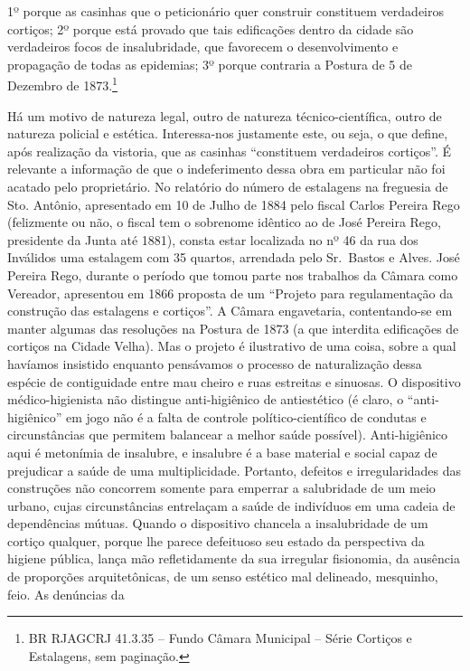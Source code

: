 1º porque as casinhas que o peticionário quer construir constituem
verdadeiros cortiços; 2º porque está provado que tais edificações dentro
da cidade são verdadeiros focos de insalubridade, que favorecem o
desenvolvimento e propagação de todas as epidemias; 3º porque contraria
a Postura de 5 de Dezembro de 1873.\footnote{BR RJAGCRJ 41.3.35 -- Fundo
  Câmara Municipal -- Série Cortiços e Estalagens, sem paginação.}

Há um motivo de natureza legal, outro de natureza técnico-científica,
outro de natureza policial e estética. Interessa-nos justamente este, ou
seja, o que define, após realização da vistoria, que as casinhas
``constituem verdadeiros cortiços''. É relevante a informação de que o
indeferimento dessa obra em particular não foi acatado pelo
proprietário. No relatório do número de estalagens na freguesia de Sto.
Antônio, apresentado em 10 de Julho de 1884 pelo fiscal Carlos Pereira
Rego (felizmente ou não, o fiscal tem o sobrenome idêntico ao de José
Pereira Rego, presidente da Junta até 1881), consta estar localizada no
nº 46 da rua dos Inválidos uma estalagem com 35 quartos, arrendada pelo
Sr.~Bastos e Alves. José Pereira Rego, durante o período que tomou parte
nos trabalhos da Câmara como Vereador, apresentou em 1866 proposta de um
``Projeto para regulamentação da construção das estalagens e cortiços''.
A Câmara engavetaria, contentando-se em manter algumas das resoluções na
Postura de 1873 (a que interdita edificações de cortiços na Cidade
Velha). Mas o projeto é ilustrativo de uma coisa, sobre a qual havíamos
insistido enquanto pensávamos o processo de naturalização dessa espécie
de contiguidade entre mau cheiro e ruas estreitas e sinuosas. O
dispositivo médico-higienista não distingue anti-higiênico de
antiestético (é claro, o ``anti-higiênico'' em jogo não é a falta de
controle político-científico de condutas e circunstâncias que permitem
balancear a melhor saúde possível). Anti-higiênico aqui é metonímia de
insalubre, e insalubre é a base material e social capaz de prejudicar a
saúde de uma multiplicidade. Portanto, defeitos e irregularidades das
construções não concorrem somente para emperrar a salubridade de um meio
urbano, cujas circunstâncias entrelaçam a saúde de indivíduos em uma
cadeia de dependências mútuas. Quando o dispositivo chancela a
insalubridade de um cortiço qualquer, porque lhe parece defeituoso seu
estado da perspectiva da higiene pública, lança mão refletidamente da
sua irregular fisionomia, da ausência de proporções arquitetônicas, de
um senso estético mal delineado, mesquinho, feio. As denúncias da
